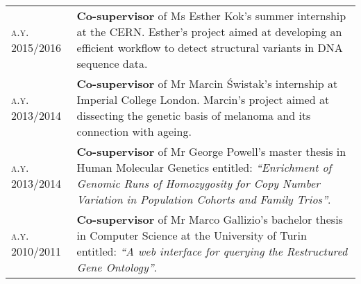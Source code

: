 \documentclass[a4paper,10pt]{article}
\newcommand{\mediumtitle}[1]{
	\vspace{0.2cm}
	{\noindent
	\Large \textsc{#1}\\[-2ex]
	\hrule
	\vspace{0.2cm}}
}
\newenvironment{doubletablelist}
{
	\vspace{-0.2cm}
	\begin{longtable}[!h]{AB}}{\end{longtable}
}
\newcommand{\dtlist}[2]{
\hspace{-3cm}
\noindent
	\begin{minipage}{0.22\textwidth}
	\begin{flushright}
	\textsc{#1}
	\end{flushright}
	\end{minipage}
	& #2\\[0.2cm]
}
\newcommand{\minusitem}{\item[-]}
\begin{document}
\begin{doubletablelist}
	\dtlist{a.y. 2015/2016}{\textbf{Co-supervisor} of Ms Esther Kok's summer internship at the CERN. Esther's project aimed at developing an efficient workflow to detect structural variants in DNA sequence data.}
	\dtlist{a.y. 2013/2014}{\textbf{Co-supervisor} of Mr Marcin \'Swistak's internship at Imperial College London. Marcin's project aimed at dissecting the genetic basis of melanoma and its connection with ageing.}
	\dtlist{a.y. 2013/2014}{\textbf{Co-supervisor} of Mr George Powell's master thesis in Human Molecular Genetics entitled: \emph{``Enrichment of Genomic Runs of Homozygosity for Copy Number Variation in Population Cohorts and Family Trios''}.}
	\dtlist{a.y. 2010/2011}{\textbf{Co-supervisor} of Mr Marco Gallizio's bachelor thesis in Computer Science at the University of Turin entitled: \emph{``A web interface for querying the Restructured Gene Ontology''}.}
\end{doubletablelist}	



%
\end{document}
